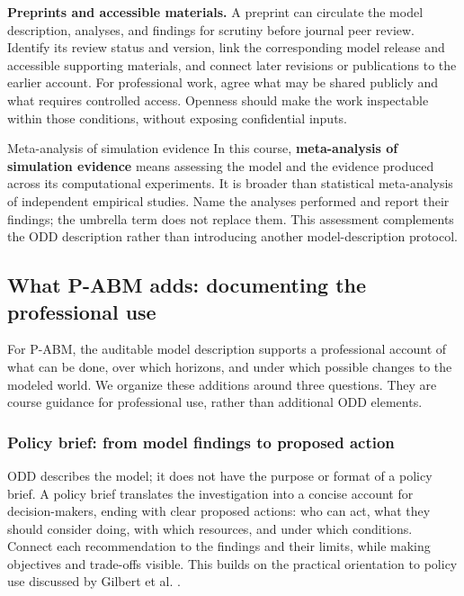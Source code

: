 \documentclass[11pt,a4paper]{article}
\begin{document}
\textbf{Preprints and accessible materials.} A preprint can circulate the model description, analyses, and findings for scrutiny before journal peer review. Identify its review status and version, link the corresponding model release and accessible supporting materials, and connect later revisions or publications to the earlier account. For professional work, agree what may be shared publicly and what requires controlled access. Openness should make the work inspectable within those conditions, without exposing confidential inputs.

\begin{principle}{Meta-analysis of simulation evidence}
In this course, \textbf{meta-analysis of simulation evidence} means assessing the model and the evidence produced across its computational experiments. It is broader than statistical meta-analysis of independent empirical studies. Name the analyses performed and report their findings; the umbrella term does not replace them. This assessment complements the ODD description rather than introducing another model-description protocol.
\end{principle}

\subsection{What P-ABM adds: documenting the professional use}

For P-ABM, the auditable model description supports a professional account of what can be done, over which horizons, and under which possible changes to the modeled world. We organize these additions around three questions. They are course guidance for professional use, rather than additional ODD elements.

\subsubsection{Policy brief: from model findings to proposed action}

ODD describes the model; it does not have the purpose or format of a policy brief. A policy brief translates the investigation into a concise account for decision-makers, ending with clear proposed actions: who can act, what they should consider doing, with which resources, and under which conditions. Connect each recommendation to the findings and their limits, while making objectives and trade-offs visible. This builds on the practical orientation to policy use discussed by Gilbert et al. \cite{gilbert_policy_2018}.
\end{document}

